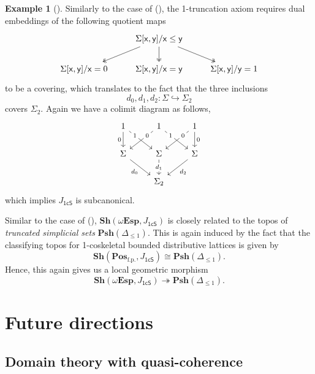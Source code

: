 \documentclass[a4paper,12pt]{amsart}
\theoremstyle{definition}
\newtheorem{example}[theorem]{Example}
\newcommand{\mb}[1]{\mathbf{#1}}
\newcommand{\mr}[1]{\mathrm{#1}}
\newcommand{\ms}[1]{\mathsf{#1}}
\newcommand{\Pos}{\mb{Pos}}
\newcommand{\sh}{\mb{Sh}}
\newcommand{\psh}{\mb{Psh}}
\newcommand{\surj}{\twoheadrightarrow}
\newcommand{\hook}{\hookrightarrow}
\newcommand{\fp}{_{\mr{f.p.}}}
\newcommand{\wTop}{\omega\mb{Esp}}
\begin{document}
\begin{example}[\AxiomOneCS]\label{exm:model1T}
  Similarly to the case of (\AxiomSL), the 1-truncation axiom requires dual embeddings of the following quotient maps
  \[\begin{tikzcd}
    & {\Sigma[\ms{x},\ms{y}]/\ms{x}\le\ms{y}} \\
    {\Sigma[\ms{x},\ms{y}]/\ms{x}=0} & {\Sigma[\ms{x},\ms{y}]/\ms{x}=\ms{y}} & {\Sigma[\ms{x},\ms{y}]/\ms{y}=1}
    \arrow[two heads, from=1-2, to=2-1]
    \arrow[two heads, from=1-2, to=2-2]
    \arrow[two heads, from=1-2, to=2-3]
  \end{tikzcd}\]
  to be a covering, which translates to the fact that the three inclusions
  \[ d_0,d_1,d_2 : \Sigma \hook \Sigma_2 \]
  covers $\Sigma_2$. Again we have a colimit diagram as follows, 
  \[\begin{tikzcd}
    1 & 1 & 1 \\
    \Sigma & \Sigma & \Sigma \\
    & {\Sigma_2}
    \arrow["0"', from=1-1, to=2-1]
    \arrow["1"{description, pos=0.25}, from=1-1, to=2-2]
    \arrow["0"{description, pos=0.25}, from=1-2, to=2-1]
    \arrow["1"{description, pos=0.25}, from=1-2, to=2-3]
    \arrow["0"{description, pos=0.25}, from=1-3, to=2-2]
    \arrow["0", from=1-3, to=2-3]
    \arrow["{d_0}"', from=2-1, to=3-2]
    \arrow["{d_1}"{description}, from=2-2, to=3-2]
    \arrow["{d_2}", from=2-3, to=3-2]
  \end{tikzcd}\]
  which implies $J_{\ms{1cS}}$ is subcanonical.
  
  Similar to the case of (\AxiomSL), $\sh(\wTop,J_{\ms{1cS}})$ is closely related to the topos of \emph{truncated simplicial sets} $\psh(\Delta_{\le 1})$. This is again induced by the fact that the classifying topos for 1-coskeletal bounded distributive lattices is given by 
  \[ \sh(\Pos\fp,J_{\ms{1cS}}) \cong \psh(\Delta_{\le 1})\text{.} \]
  Hence, this again gives us a local geometric morphism
  \[ \sh(\wTop,J_{\ms{1cS}}) \surj \psh(\Delta_{\le 1})\text{.} \]
\end{example}


\section{Future directions}

\subsection{Domain theory with quasi-coherence}
\end{document}
